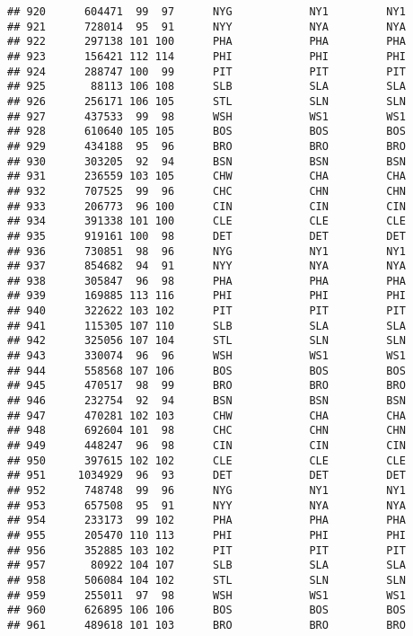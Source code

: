 \documentclass[]{article}
\begin{document}
\begin{verbatim}
## 920      604471  99  97      NYG            NY1         NY1
## 921      728014  95  91      NYY            NYA         NYA
## 922      297138 101 100      PHA            PHA         PHA
## 923      156421 112 114      PHI            PHI         PHI
## 924      288747 100  99      PIT            PIT         PIT
## 925       88113 106 108      SLB            SLA         SLA
## 926      256171 106 105      STL            SLN         SLN
## 927      437533  99  98      WSH            WS1         WS1
## 928      610640 105 105      BOS            BOS         BOS
## 929      434188  95  96      BRO            BRO         BRO
## 930      303205  92  94      BSN            BSN         BSN
## 931      236559 103 105      CHW            CHA         CHA
## 932      707525  99  96      CHC            CHN         CHN
## 933      206773  96 100      CIN            CIN         CIN
## 934      391338 101 100      CLE            CLE         CLE
## 935      919161 100  98      DET            DET         DET
## 936      730851  98  96      NYG            NY1         NY1
## 937      854682  94  91      NYY            NYA         NYA
## 938      305847  96  98      PHA            PHA         PHA
## 939      169885 113 116      PHI            PHI         PHI
## 940      322622 103 102      PIT            PIT         PIT
## 941      115305 107 110      SLB            SLA         SLA
## 942      325056 107 104      STL            SLN         SLN
## 943      330074  96  96      WSH            WS1         WS1
## 944      558568 107 106      BOS            BOS         BOS
## 945      470517  98  99      BRO            BRO         BRO
## 946      232754  92  94      BSN            BSN         BSN
## 947      470281 102 103      CHW            CHA         CHA
## 948      692604 101  98      CHC            CHN         CHN
## 949      448247  96  98      CIN            CIN         CIN
## 950      397615 102 102      CLE            CLE         CLE
## 951     1034929  96  93      DET            DET         DET
## 952      748748  99  96      NYG            NY1         NY1
## 953      657508  95  91      NYY            NYA         NYA
## 954      233173  99 102      PHA            PHA         PHA
## 955      205470 110 113      PHI            PHI         PHI
## 956      352885 103 102      PIT            PIT         PIT
## 957       80922 104 107      SLB            SLA         SLA
## 958      506084 104 102      STL            SLN         SLN
## 959      255011  97  98      WSH            WS1         WS1
## 960      626895 106 106      BOS            BOS         BOS
## 961      489618 101 103      BRO            BRO         BRO

\end{verbatim}
\end{document}

